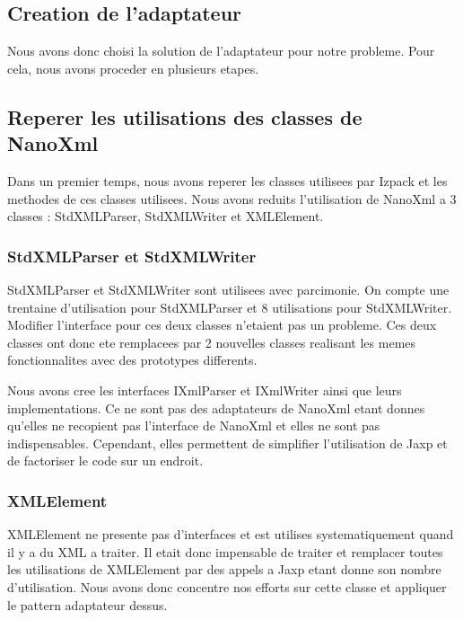 \subsection{Creation de l'adaptateur}
Nous avons donc choisi la solution de l'adaptateur pour notre probleme. Pour cela, nous avons proceder en plusieurs etapes.
\subsection{Reperer les utilisations des classes de NanoXml}
Dans un premier temps, nous avons reperer les classes utilisees par Izpack et les methodes de ces classes utilisees. Nous avons reduits l'utilisation de NanoXml a 3 classes : StdXMLParser, StdXMLWriter et XMLElement.
\subsubsection{StdXMLParser et StdXMLWriter}
StdXMLParser et StdXMLWriter sont utilisees avec parcimonie. On compte une trentaine d'utilisation pour StdXMLParser et 8 utilisations pour StdXMLWriter. Modifier l'interface pour ces deux classes n'etaient pas un probleme. Ces deux classes ont donc ete remplacees par 2 nouvelles classes realisant les memes fonctionnalites avec des prototypes differents.

Nous avons cree les interfaces IXmlParser et IXmlWriter ainsi que leurs implementations. Ce ne sont pas des adaptateurs de NanoXml etant donnes qu'elles ne recopient pas l'interface de NanoXml et elles ne sont pas indispensables. Cependant, elles permettent de simplifier l'utilisation de Jaxp et de factoriser le code sur un endroit.
\subsubsection{XMLElement}
XMLElement ne presente pas d'interfaces et est utilises systematiquement quand il y a du XML a traiter. Il etait donc impensable de traiter et remplacer toutes les utilisations de XMLElement par des appels a Jaxp etant donne son nombre d'utilisation. Nous avons donc concentre nos efforts sur cette classe et appliquer le pattern adaptateur dessus.

